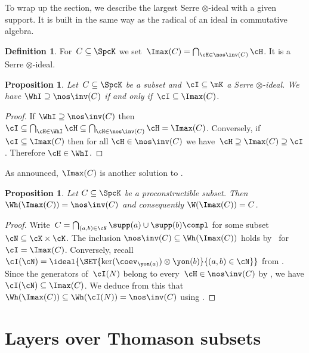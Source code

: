 \documentclass[11pt]{amsart}
\numberwithin{equation}{section} %
\theoremstyle{plain}
\newtheorem{prop}[equation]{Proposition}
\theoremstyle{definition}
\newtheorem{dfn}[equation]{Definition}
\theoremstyle{remark}
\begin{document}
To wrap up the section, we describe the largest Serre $\otimes$-ideal with a given support. It is built in the same way as the radical of an ideal in commutative algebra.

%
\begin{dfn}
\label{dfn:Imax}%
For~$C\subseteq\SpcK$ we set~$\Imax(C)=\bigcap_{\cH\in\nos\inv(C)}\cH$. It is a Serre $\otimes$-ideal.
%
\end{dfn}
%

%
\begin{prop}
\label{prop:Imax}%
Let~$C\subseteq\SpcK$ be a subset and~$\cI\subseteq \mK$ a Serre $\otimes$-ideal.
We have $\WhI\supseteq \nos\inv(C)$ if and only if~$\cI\subseteq\Imax(C)$.
\end{prop}

\begin{proof}
If $\WhI\supseteq \nos\inv(C)$ then $\cI \subseteq \bigcap_{\cH \in \WhI} \cH \subseteq \bigcap_{\cH \in \nos\inv(C)} \cH =\Imax(C)$. Conversely, if $\cI\subseteq\Imax(C)$ then for all $\cH \in \nos\inv(C)$ we have~$\cH \supseteq\Imax(C) \supseteq \cI$. Therefore $\cH \in \WhI$. 
\end{proof}

As announced, $\Imax(C)$ is another solution to .
%
\begin{prop}
\label{prop:Spc(Imax)}%
Let $C\subseteq\SpcK$ be a proconstructible subset. Then $\Wh(\Imax(C))=\nos\inv(C)$ and consequently $\W(\Imax(C))=C$.
\end{prop}
%
\begin{proof}
Write~$C=\bigcap_{(a,b)\in\cN}\supp(a)\cup\supp(b)\compl$ for some subset~$\cN\subseteq\cK\times\cK$.
The inclusion $\nos\inv(C) \subseteq \Wh(\Imax(C))$ holds by~ for~$\cI=\Imax(C)$.
Conversely, recall~$\cI(\cN)=\ideal{\SET{\ker(\coev_{\yon(a)})\otimes\yon(b)}{(a,b)\in\cN}}$ from . 
Since the generators of~$\cI(N)$ belong to every~$\cH\in \nos\inv(C)$ by , we have $\cI(\cN)\subseteq\Imax(C)$.
We deduce from this that $\Wh(\Imax(C))\subseteq \Wh(\cI(N))=\nos\inv(C)$ using .
\end{proof}

\section{Layers over Thomason subsets}
\label{sec:Thom-layers}%
\end{document}
